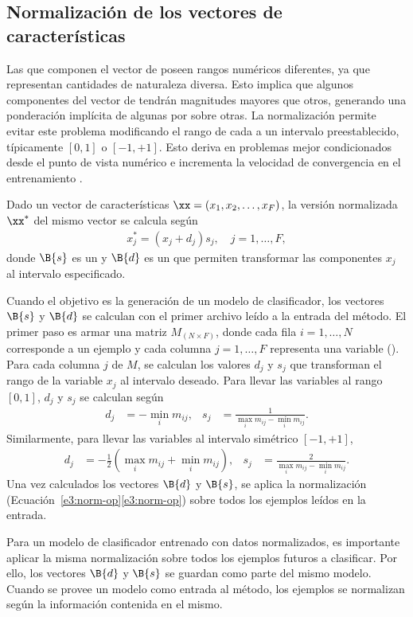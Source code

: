 %
%
%
\subsection{Normalización de los vectores de características}
%
Las  que componen el vector de  poseen rangos
numéricos diferentes, ya que representan cantidades de naturaleza
diversa.
Esto implica que algunos componentes del vector de  tendrán
magnitudes mayores que otros, generando una ponderación implícita de
algunas  por sobre otras.
La normalización permite evitar este problema modificando el rango de
cada \caract{} a un intervalo preestablecido, típicamente $[0,1]$ o
$[-1,+1]$.
Esto deriva en problemas mejor condicionados desde el punto de vista
numérico e incrementa la velocidad de convergencia en el
entrenamiento \cite{nnfaq2}.

Dado un vector de características $\xx=(x_{1},x_{2},\ldots,x_{F})$, la
versión normalizada $\xx^*$ del mismo vector se calcula según
%
\begin{align}
  \label{e3:norm-op}
  x_j^{*} = ( x_j + d_j ) s_j, \quad j=1,\ldots,F,
\end{align}
%
donde $\B{s}$ es un  y $\B{d}$ es un  que permiten transformar las componentes $x_j$ al
intervalo especificado.

Cuando el objetivo es la generación de un modelo de clasificador, los
vectores $\B{s}$ y $\B{d}$ se calculan con el primer archivo leído a
la entrada del método.
El primer paso es armar una matriz
$M{}_{({N}\times{}F)}$, donde cada fila $i=1,\ldots,N$ corresponde a
un ejemplo y cada columna $j=1,\ldots,F$ representa una variable
(\caract{}).
Para cada columna $j$ de $M$, se calculan los valores $d_j$ y $s_j$
que transforman el rango de la variable $x_j$ al intervalo deseado.
Para llevar las variables al rango $[0,1]$, $d_j$ y $s_j$ se
calculan según
%
\begin{align}
  d_j &= - \min_i m_{ij}, &
  s_j &= \frac{1}{\max_i m_{ij} - \min_i m_{ij}}.
\end{align}
%
Similarmente, para llevar las variables al intervalo simétrico
$[-1,+1]$,
%
\begin{align}
  d_j &= -\frac{1}{2}\left(\max_i m_{ij} + \min_i m_{ij}\right), &
  s_j &= \frac{2}{\max_i m_{ij} - \min_i m_{ij}}.
\end{align}
%
Una vez calculados los vectores $\B{d}$ y $\B{s}$, se aplica la
normalización (\iflatexml{}Ecuación~\ref{e3:norm-op}\else\autoref{e3:norm-op}\fi)
sobre todos los ejemplos leídos en la entrada.

Para un modelo de clasificador entrenado con datos normalizados, es
importante aplicar la misma normalización sobre todos los ejemplos
futuros a clasificar.
Por ello, los vectores $\B{d}$ y $\B{s}$ se guardan como parte del
mismo modelo.
Cuando se provee un modelo como entrada al método, los ejemplos se
normalizan según la información contenida en el mismo.
